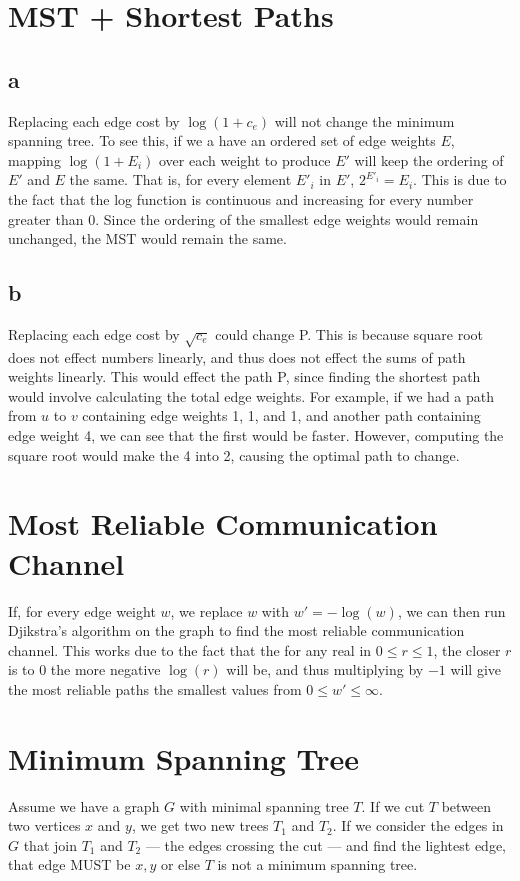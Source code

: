 \documentclass[14pt, letterpaper]{article}
\begin{document}
\section{MST + Shortest Paths}
\subsection{a}
Replacing each edge cost by $\log(1 + c_e)$ will not change the minimum 
spanning tree. To see this, if we a have an ordered set of edge weights $E$,
mapping $\log(1 + E_i)$ over each weight to produce $E'$ will keep the ordering
of $E'$ and $E$ the same. That is, for every element $E'_i$ in $E'$,
$2^{E'_i} = E_i$. This is due to the fact that the log function is continuous
and increasing for every number greater than 0. Since the ordering of the
smallest edge weights would remain unchanged, the MST would remain the same.

\subsection{b}
Replacing each edge cost by $\sqrt{c_e}$ could change P. This is because square
root does not effect numbers linearly, and thus does not effect the sums of path
weights linearly. This would effect the path P, since finding the shortest path
would involve calculating the total edge weights. For example, if we had a path
from $u$ to $v$ containing edge weights 1, 1, and 1, and another path containing
edge weight 4, we can see that the first would be faster. However, computing the
square root would make the 4 into 2, causing the optimal path to change.

\section{Most Reliable Communication Channel}
If, for every edge weight $w$, we replace $w$ with $w' = -\log(w)$, we can then
run Djikstra's algorithm on the graph to find the most reliable communication
channel. This works due to the fact that the for any real in $0 \leq r \leq 1$,
the closer $r$ is to $0$ the more negative $\log(r)$ will be, and thus
multiplying by $-1$ will give the most reliable paths the smallest values from
$0 \leq w' \leq \infty$.

\section{Minimum Spanning Tree}
Assume we have a graph $G$ with minimal spanning tree $T$. If we cut $T$ between
two vertices $x$ and $y$, we get two new trees $T_1$ and $T_2$. If we consider
the edges in $G$ that join $T_1$ and $T_2$ --- the edges crossing the cut
--- and find the lightest edge, that edge MUST be $x, y$ or else $T$ is not
a minimum spanning tree.
\end{document}
